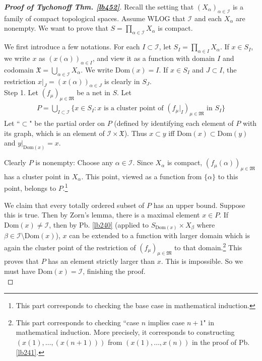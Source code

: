 \documentclass[12pt,b5paper,notitlepage]{article}
\theoremstyle{definition}
\theoremstyle{plain}
\newcommand{\fk}{\mathfrak}
\newcommand{\Dom}{\mathrm{Dom}}
\newcommand{\scr}{\mathscr}
\numberwithin{equation}{section}
\begin{document}
\begin{proof}[\textbf{Proof of Tychonoff Thm. \ref{lb452}}]
Recall the setting that $(X_\alpha)_{\alpha\in\scr I}$ is a family of compact topological spaces. Assume WLOG that $\scr I$ and each $X_\alpha$ are nonempty. We want to prove that $S=\prod_{\alpha\in\scr I}X_\alpha$ is compact. 

We first introduce a few notations. For each $I\subset\scr I$, let $S_I=\prod_{\alpha\in I}X_\alpha$. If $x\in S_I$, we write $x$ as $(x(\alpha))_{\alpha\in I}$, and view it as a function with domain $I$ and codomain $\fk X=\bigcup_{\alpha\in\scr I}X_\alpha$. We write $\Dom(x)=I$. If $x\in S_I$ and $J\subset I$, the restriction $x|_J=(x(\alpha))_{\alpha\in J}$ is clearly in $S_J$.\\[-1ex]

Step 1. Let $(f_\mu)_{\mu\in\fk M}$ be a net in $S$. Let
\begin{align*}
P=\bigcup_{I\subset\scr I}\big\{x\in S_I: x\text{ is a cluster point of }(f_\mu|_I)_{\mu\in\fk M} \text{ in }S_I \big\}
\end{align*}
Let ``$\subset$" be the partial order on $P$ (defined by identifying each element of $P$ with its graph, which is an element of $\scr I\times \fk X$). Thus $x\subset y$ iff $\Dom(x)\subset\Dom(y)$ and $y|_{\Dom(x)}=x$.


Clearly $P$ is nonempty: Choose any $\alpha\in\scr I$. Since $X_\alpha$ is compact, $(f_\mu(\alpha))_{\mu\in\fk M}$ has a cluster point in $X_\alpha$. This point, viewed as a function from $\{\alpha\}$ to this point, belongs to $P$.\footnote{This part corresponds to checking the base case in mathematical induction.} 

We claim that every totally ordered subset of $P$ has an upper bound. Suppose this is true. Then by Zorn's lemma, there is a maximal element $x\in P$. If $\Dom(x)\neq \scr I$, then by Pb. \ref{lb240} (applied to $S_{\Dom(x)}\times X_\beta$ where $\beta\in \scr I\setminus\Dom(x)$), $x$ can be extended to a function with larger domain which is again the cluster point of the restriction of $(f_\mu)_{\mu\in\fk M}$ to that domain.\footnote{This part corresponds to checking ``case $n$ implies case $n+1$" in mathematical induction. More precisely, it corresponds to constructing $(x(1),\dots,(x(n+1)))$ from $(x(1),\dots,x(n))$ in the proof of Pb. \ref{lb241}.} This proves that $P$ has an element strictly larger than $x$. This is impossible. So we must have $\Dom(x)=\scr I$, finishing the proof.\\[-1ex]


\end{proof}
\end{document}
